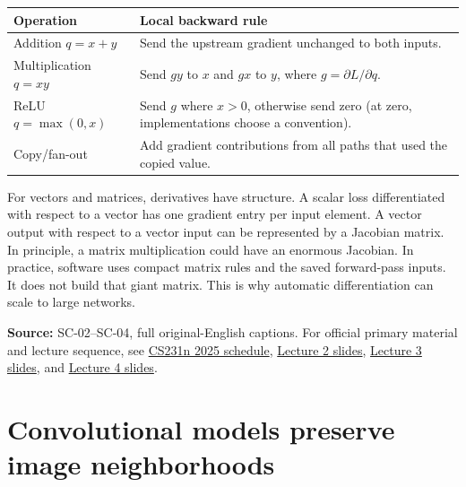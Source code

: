 {\def\LTcaptype{none} %
\begin{longtable}[]{@{}
  >{\raggedright\arraybackslash}p{}
  >{\raggedright\arraybackslash}p{}@{}}
\toprule\noalign{}
\begin{minipage}[b]{\linewidth}\raggedright
Operation
\end{minipage} & \begin{minipage}[b]{\linewidth}\raggedright
Local backward rule
\end{minipage} \\
\midrule\noalign{}
\endhead
\bottomrule\noalign{}
\endlastfoot
Addition \(q=x+y\) & Send the upstream gradient unchanged to both inputs. \\
Multiplication \(q=xy\) & Send \(g y\) to \(x\) and \(g x\) to \(y\), where \(g=\partial L/\partial q\). \\
ReLU \(q=\max(0,x)\) & Send \(g\) where \(x>0\), otherwise send zero (at zero, implementations choose a convention). \\
Copy/fan-out & Add gradient contributions from all paths that used the copied value. \\
\end{longtable}
}

For vectors and matrices, derivatives have structure. A scalar loss differentiated with respect to a vector has one gradient entry per input element. A vector output with respect to a vector input can be represented by a Jacobian matrix. In principle, a matrix multiplication could have an enormous Jacobian. In practice, software uses compact matrix rules and the saved forward-pass inputs. It does not build that giant matrix. This is why automatic differentiation can scale to large networks.

\textbf{Source:} SC-02--SC-04, full original-English captions. For official primary material and lecture sequence, see \href{https://cs231n.stanford.edu/2025/schedule.html}{CS231n 2025 schedule}, \href{https://cs231n.stanford.edu/slides/2025/lecture_2.pdf}{Lecture 2 slides}, \href{https://cs231n.stanford.edu/slides/2025/lecture_3.pdf}{Lecture 3 slides}, and \href{https://cs231n.stanford.edu/slides/2025/lecture_4.pdf}{Lecture 4 slides}.

\section{Convolutional models preserve image neighborhoods}\label{04-visual-computing-ii-ch031-convolutional-models-preserve-image-neighborhoods}

